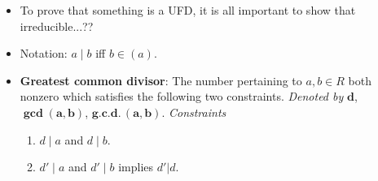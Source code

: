 \documentclass[../notes.tex]{subfiles}
\begin{document}
\begin{itemize}
\begin{proof}
        \begin{equation*}
            1 = u'c
            = \pi_1bc
            = \pi_1(bc)
        \end{equation*}
        i.e., that $\pi_1$ is a unit, contradicting the hypothesis that it's irreducible. Therefore, $u'\notin(\pi_1)$. It follows that one of the $\pi_i'\in(\pi_1)$. WLOG, let $\pi_1'\in(\pi_1)$. Then $\pi_1'=u_1\pi_1$ for some $u_1\in R$. In particular, since $\pi_1'$ is irreducible, then either $u_1\in R^\times$ or $\pi_1\in R^\times$. But we can't have the second case since $\pi_1$ is irreducible (and hence not a unit) by assumption. Thus $u_1\in R^\times$. It follows that
        \begin{align*}
            a &= a\\
            u\pi_1\cdots\pi_r &= u'\pi_1'\cdots\pi_s'\\
            u\pi_1\cdots\pi_r &= u'u_1\pi_1\pi_2'\cdots\pi_s'\\
            u\pi_2\cdots\pi_r &= u'u_1\pi_2'\cdots\pi_s'
        \end{align*}
        where we apply the cancellation lemma in the last step, as permitted by the facts that $R$ is an integral domain and $\pi_1$ is irreducible (hence nonzero). Thus, by the induction hypothesis, the factorizations $u\pi_2\cdots\pi_r$ and $u'u_1\pi_2'\cdots\pi_s'$ are equivalent. It follows that $r=s$ and there exists $\sigma\in S_{[2:r]}$ and units $u_2,\dots,u_r\in R^\times$ such that $\pi_i'=u_i\pi_{\sigma(i)}$ ($i=2,\dots,r$). Extend $\sigma$ to $S_r$ by defining $\sigma(1)=1$. Thus, taking $\sigma\in S_r$ and $u_1,\dots,u_r\in R^\times$, we know that $\pi_i'=u_i\pi_i$ ($i=1,\dots,r$). Therefore, $u\pi_1\cdots\pi_r$ and $u'\pi_1'\cdots\pi_s'$ are equivalent factorizations of $a$, as desired.
    \end{proof}
    \item To prove that something is a UFD, it is all important to show that irreducible...??
    \item Notation: $a\mid b$ iff $b\in(a)$.
    \item \textbf{Greatest common divisor}: The number pertaining to $a,b\in R$ both nonzero which satisfies the following two constraints. \emph{Denoted by} $\bm{d}$, $\bm{\gcd(a,b)}$, $\bm{\textbf{g.c.d.}\,(a,b)}$. \emph{Constraints}
    \begin{enumerate}[label={(\roman*)}]
        \item $d\mid a$ and $d\mid b$.
        \item $d'\mid a$ and $d'\mid b$ implies $d'|d$.

\end{enumerate}
\end{itemize}
\end{document}
